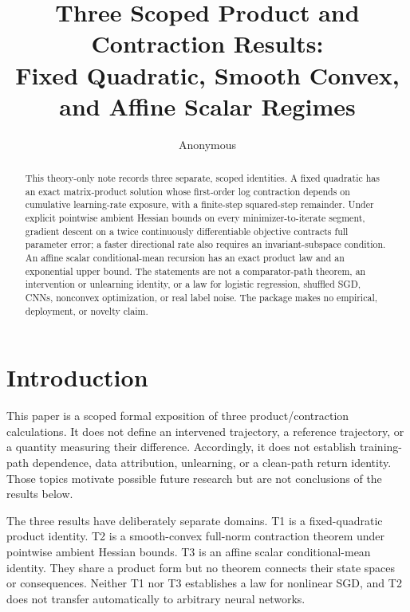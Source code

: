 \documentclass{article}
\title{Three Scoped Product and Contraction Results:\\
Fixed Quadratic, Smooth Convex, and Affine Scalar Regimes}
\author{Anonymous}
\begin{document}
\maketitle

\begin{abstract}
This theory-only note records three separate, scoped identities. A fixed
quadratic has an exact matrix-product solution whose first-order log
contraction depends on cumulative learning-rate exposure, with a finite-step
squared-step remainder. Under explicit pointwise ambient Hessian bounds on
every minimizer-to-iterate segment, gradient descent on a twice continuously
differentiable objective contracts full parameter error; a faster directional
rate also requires an invariant-subspace condition. An affine scalar
conditional-mean recursion has an exact product law and an exponential upper
bound. The statements are not a comparator-path theorem, an intervention or
unlearning identity, or a law for logistic regression, shuffled SGD, CNNs,
nonconvex optimization, or real label noise. The package makes no empirical,
deployment, or novelty claim.
\end{abstract}

\section{Introduction}
\label{sec:intro}

This paper is a scoped formal exposition of three product/contraction
calculations. It does not define an intervened trajectory, a reference
trajectory, or a quantity measuring their difference. Accordingly, it does
not establish training-path dependence, data attribution, unlearning, or a
clean-path return identity. Those topics motivate possible future research but
are not conclusions of the results below.

The three results have deliberately separate domains. T1 is a fixed-quadratic
product identity. T2 is a smooth-convex full-norm contraction theorem under
pointwise ambient Hessian bounds. T3 is an affine scalar conditional-mean
identity. They share a product form but no theorem connects their state spaces
or consequences. Neither T1 nor T3 establishes a law for nonlinear SGD, and
T2 does not transfer automatically to arbitrary neural networks.
\end{document}

